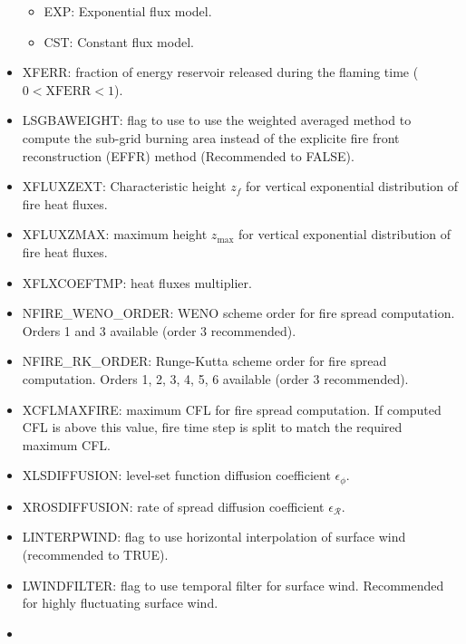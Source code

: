 \begin{itemize}
\begin{itemize}
    \item EXP: Exponential flux model.
    \item CST: Constant flux model.
  \end{itemize}
  \item
  XFERR: fraction of energy reservoir released during the flaming time ($0 < \mathrm{XFERR} < 1$).
  \item
  LSGBAWEIGHT: flag to use to use the weighted averaged method to compute the sub-grid burning area instead of the explicite fire front reconstruction (EFFR) method (Recommended to FALSE).
  \item
  XFLUXZEXT: Characteristic height $z_f$ for vertical exponential distribution of fire heat fluxes.
  \item
  XFLUXZMAX: maximum height $z_{\mathrm{max}}$ for vertical exponential distribution of fire heat fluxes.
  \item
  XFLXCOEFTMP: heat fluxes multiplier.
  \item
  NFIRE\_WENO\_ORDER: WENO scheme order for fire spread computation. Orders 1 and 3 available (order 3 recommended).
  \item
  NFIRE\_RK\_ORDER: Runge-Kutta scheme order for fire spread computation. Orders 1, 2, 3, 4, 5, 6 available (order 3 recommended).
  \item
  XCFLMAXFIRE: maximum CFL for fire spread computation. If computed CFL is above this value, fire time step is split to match the required maximum CFL.
  \item
  XLSDIFFUSION: level-set function diffusion coefficient $\epsilon_\phi$.
  \item
  XROSDIFFUSION: rate of spread diffusion coefficient $\epsilon_{\mathcal R}$.
  \item
  LINTERPWIND: flag to use horizontal interpolation of surface wind (recommended to TRUE).
  \item
  LWINDFILTER: flag to use temporal filter for surface wind. Recommended for highly fluctuating surface wind.
  \item

\end{itemize}
